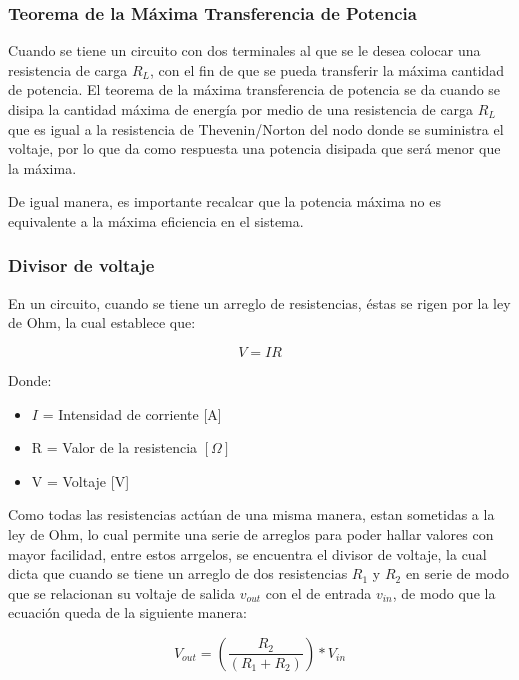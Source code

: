 \subsubsection{Teorema de la Máxima Transferencia de Potencia}

Cuando se tiene un circuito con dos terminales al que se le desea colocar una resistencia de carga $R_L$, con el fin de que se pueda
transferir la máxima cantidad de potencia. El teorema de la máxima transferencia de potencia se da cuando se disipa la cantidad máxima de energía por medio de una resistencia de carga $R_L$ que es igual a la resistencia de Thevenin/Norton
del nodo donde se suministra el voltaje, por lo que da como respuesta una potencia disipada que será menor que la máxima.

De igual manera, es importante recalcar que la potencia máxima no es equivalente a la máxima eficiencia en el sistema.

\subsubsection{Divisor de voltaje}

En un circuito, cuando se tiene un arreglo de resistencias, éstas se rigen por la ley de Ohm, la cual establece que:

\begin{equation*}
    V=IR
\end{equation*}

Donde:
\begin{itemize}
    \item $I$ = Intensidad de corriente [A]
    \item R = Valor de la resistencia $[\Omega]$
    \item V = Voltaje [V]
\end{itemize}

Como todas las resistencias actúan de una misma manera, estan sometidas a la ley de Ohm, lo cual permite una serie de arreglos para poder hallar valores con mayor facilidad,
entre estos arrgelos, se encuentra el divisor de voltaje, la cual dicta que cuando se tiene un arreglo de dos resistencias $R_1$ y $R_2$ en serie de modo que se relacionan
su voltaje de salida $v_{out}$ con el de entrada $v_{in}$, de modo que la ecuación queda de la siguiente manera:

\begin{equation*}
    V_{out}=(\frac{R_2}{(R_1+R_2)})*V_{in}
\end{equation*}

